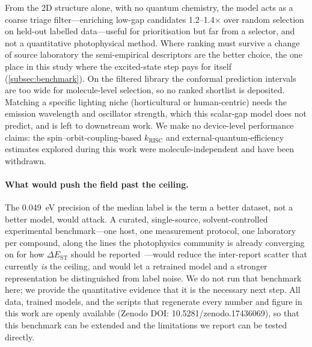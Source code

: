 From the 2D structure alone, with no quantum chemistry, the model acts as a coarse
triage filter---enriching low-gap candidates \numrange{1.2}{1.4}$\times$ over random
selection on held-out labelled data---useful for prioritisation but far from a
selector, and not a quantitative photophysical method. Where ranking must survive a
change of source laboratory the semi-empirical descriptors are the better choice,
the one place in this study where the excited-state step pays for itself
(\cref{subsec:benchmark}). On the filtered library
the conformal prediction intervals are too wide for molecule-level selection, so
no ranked shortlist is deposited. Matching a specific lighting niche (horticultural or
human-centric) needs the emission wavelength and oscillator strength, which this
scalar-gap model does not predict, and is left to downstream work.
We make no device-level performance claims: the spin--orbit-coupling-based
$k_\text{RISC}$ and external-quantum-efficiency estimates explored during this work
were molecule-independent and have been withdrawn.

\paragraph{What would push the field past the ceiling.}
The \qty{0.049}{\electronvolt} precision of the median label is the term a better
dataset, not a better model, would attack. A curated, single-source,
solvent-controlled experimental benchmark---one host, one measurement protocol, one
laboratory per compound, along the lines the photophysics community is already
converging on for how $\Delta E_\text{ST}$ should be reported~\cite{Shuaib2026}---would
reduce the inter-report scatter that currently \emph{is} the ceiling, and would let a
retrained model and a stronger representation be distinguished from label noise. We do not run that benchmark here; we provide the
quantitative evidence that it is the necessary next step. All data, trained models,
and the scripts that regenerate every number and figure in this work are openly
available (Zenodo DOI: 10.5281/zenodo.17436069), so that this benchmark can be
extended and the limitations we report can be tested directly.
